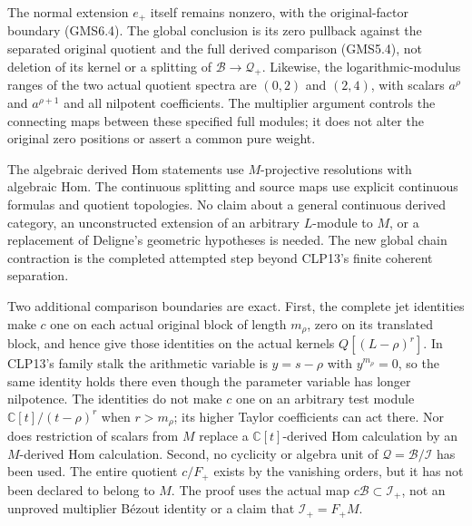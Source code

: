 The normal extension \(e_+\) itself remains nonzero, with the
original-factor boundary (GMS6.4). The global conclusion is its zero
pullback against the separated original quotient and the full derived
comparison (GMS5.4), not deletion of its kernel or a splitting of
\(\mathcal B\to\mathcal Q_+\). Likewise, the logarithmic-modulus ranges
of the two actual quotient spectra are \((0,2)\) and \((2,4)\), with
scalars \(a^\rho\) and \(a^{\rho+1}\) and all nilpotent coefficients.
The multiplier argument controls the connecting maps between these
specified full modules; it does not alter the original zero positions or
assert a common pure weight.

The algebraic derived Hom statements use \(M\)-projective resolutions
with algebraic Hom. The continuous splitting and source maps use
explicit continuous formulas and quotient topologies. No claim about a
general continuous derived category, an unconstructed extension of an
arbitrary \(L\)-module to \(M\), or a replacement of Deligne's geometric
hypotheses is needed. The new global chain contraction is the completed
attempted step beyond CLP13's finite coherent separation.

Two additional comparison boundaries are exact. First, the complete jet
identities make \(c\) one on each actual original block of length
\(m_\rho\), zero on its translated block, and hence give those
identities on the actual kernels \(Q[(L-\rho)^r]\). In CLP13's family
stalk the arithmetic variable is \(y=s-\rho\) with \(y^{m_\rho}=0\), so
the same identity holds there even though the parameter variable has
longer nilpotence. The identities do not make \(c\) one on an arbitrary
test module \(\mathbb C[t]/(t-\rho)^r\) when \(r>m_\rho\); its higher
Taylor coefficients can act there. Nor does restriction of scalars from
\(M\) replace a \(\mathbb C[t]\)-derived Hom calculation by an
\(M\)-derived Hom calculation. Second, no cyclicity or algebra unit of
\(\mathcal Q=\mathcal B/\mathcal I\) has been used. The entire quotient
\(c/F_+\) exists by the vanishing orders, but it has not been declared
to belong to \(M\). The proof uses the actual map
\(c\mathcal B\subset\mathcal I_+\), not an unproved multiplier Bézout
identity or a claim that \(\mathcal I_+=F_+M\).
